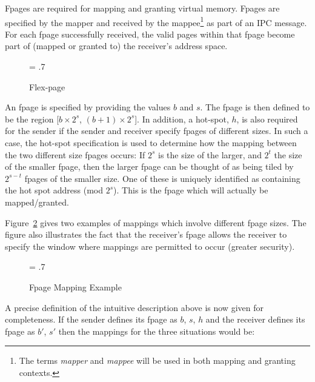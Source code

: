 Fpages are required for mapping and granting virtual memory. Fpages
are specified by the mapper and received by the mappee\footnote{The
  terms \emph{mapper} and \emph{mappee} will be used in both mapping
  and granting contexts.} as part of an IPC message. For each fpage
successfully received, the valid pages within that fpage become part
of (mapped or granted to) the receiver's address space.

\begin{figure}[htb]
\begin{center}
\leavevmode
\epsfxsize = .7\textwidth
{}
\end{center}
\caption{Flex-page}
\label{fig:fpage}
\end{figure}

An fpage is specified by providing the values $b$ and $s$. The fpage
is then defined to be the region [$b \times 2^{s}$, $(b + 1) \times
2^{s}$]. In addition, a hot-spot, $h$, is also required for the sender
if the sender and receiver specify fpages of different sizes. In such
a case, the hot-spot specification is used to determine how the
mapping between the two different size fpages occurs: If \(2^s\) is
the size of the larger, and \(2^t\) the size of the smaller fpage,
then the larger fpage can be thought of as being tiled by \(2^{s-t}\)
fpages of the smaller size. One of these is uniquely identified as
containing the hot spot address (mod \(2^s\)). This is the fpage which
will actually be mapped/granted.

Figure~\ref{fig:fpmap} gives two examples of mappings which involve
different fpage sizes. The figure also illustrates the fact that the
receiver's fpage allows the receiver to specify the window where
mappings are permitted to occur (greater security).

\begin{figure}[htb]
\begin{center}
\leavevmode
\epsfxsize = .7\textwidth
{}
\end{center}
\caption{Fpage Mapping Example}
\label{fig:fpmap}
\end{figure}

A precise definition of the intuitive description above is now given
for completeness. If the sender defines its fpage as $b$, $s$, $h$ and
the receiver defines its fpage as $b'$, $s'$ then the mappings for the
three situations would be:

